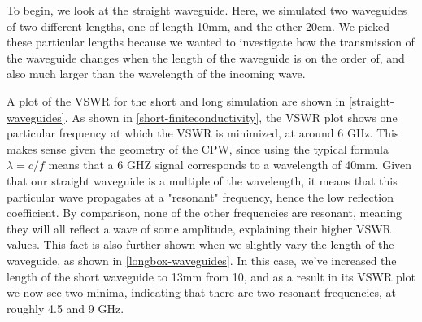 To begin, we look at the straight waveguide. Here, we simulated two waveguides of two different lengths, one
of length 10mm, and the other 20cm. We picked these particular lengths because we wanted to investigate how
the transmission of the waveguide changes when the length of the waveguide is on the order of, and also much
larger than the wavelength of the incoming wave. 

A plot of the VSWR for the short and long simulation are shown in \cref{straight-waveguides}. As shown in
\cref{short-finiteconductivity}, the VSWR plot shows one particular frequency at which the VSWR is minimized,
at around 6 GHz. This makes sense given the geometry of the CPW, since using the typical formula \( \lambda
= c / f \) means that a 6 GHZ signal corresponds to a wavelength of 40mm. Given that our straight waveguide
is a multiple of the wavelength, it means that this particular wave propagates at a "resonant" frequency,
hence the low reflection coefficient. By comparison, none of the other frequencies are resonant, meaning they
will all reflect a wave of some amplitude, explaining their higher VSWR values. This fact is also further
shown when we slightly vary the length of the waveguide, as shown in \cref{longbox-waveguides}. In this case,
we've increased the length of the short waveguide to 13mm from 10, and as a result in its VSWR plot we now
see two minima, indicating that there are two resonant frequencies, at roughly 4.5 and 9 GHz.

